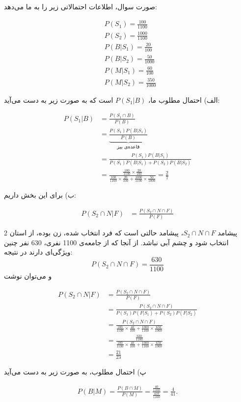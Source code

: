 \documentclass[10pt,letterpaper]{report}
\newcounter{questionanswernumber}
\newcommand{\QA}{
\textbf{پاسخ سوال \thequestionanswernumber)}
\stepcounter{questionanswernumber}
}
\newcommand{\eqn}[1]{
\[\begin{split}
#1
\end{split}\]
}
\begin{document}
صورت سوال، اطلاعات احتمالاتی زیر را به ما می‌دهد:
\eqn{
&
P(S_1)=\frac{100}{1100}
\\&
P(S_2)=\frac{1000}{1100}
\\&
P(B|S_1)=\frac{20}{100}
\\&
P(B|S_2)=\frac{50}{1000}
\\&
P(M|S_1)=\frac{60}{100}
\\&
P(M|S_2)=\frac{350}{1000}
}

الف) احتمال مطلوب ما،
$P(S_1|B)$
است که به صورت زیر به دست می‌آید:
\eqn{
P(S_1|B)&=
\frac{P(S_1\cap B)}{P(B)}
\\&=
\underbrace{\frac{P(S_1)P(B|S_1)}{P(B)}}_{\text{قاعده‌ی بیز}}
\\&=
\frac{P(S_1)P(B|S_1)}{P(S_1)P(B|S_1)+P(S_2)P(B|S_2)}
\\&=
\frac{
\frac{100}{1100}\times \frac{20}{100}
}{
\frac{100}{1100}\times \frac{20}{100}+\frac{1000}{1100}\times \frac{50}{1000}
}
=\frac{2}{7}
}

ب) برای این بخش داریم:
\eqn{
P(S_2\cap N|F)&=
\frac{P(S_2\cap N\cap F)}{P(F)}
}
پیشامد $S_2\cap N\cap F$، پیشامد حالتی است که فرد انتخاب شده، زن بوده، از استان 2 انتخاب شود و چشم آبی نباشد. از آنجا که از جامعه‌ی 1100 نفری، 630 نفر چنین ویژگی‌ای دارند در نتیجه:
$$P(S_2\cap N\cap F)=\frac{630}{1100}$$
و می‌توان نوشت
\eqn{
P(S_2\cap N|F)&=
\frac{P(S_2\cap N\cap F)}{P(F)}
\\&=
\frac{P(S_2\cap N\cap F)}{P(S_1)P(F|S_1)+P(S_2)P(F|S_2)}
\\&=
\frac{P(S_2\cap N\cap F)}{
\frac{100}{1100}\times \frac{40}{100}+\frac{1000}{1100}\times \frac{650}{1000}
}
\\&=
\frac{\frac{630}{1100}}{
\frac{100}{1100}\times \frac{40}{100}+\frac{1000}{1100}\times \frac{650}{1000}
}
\\&=
\frac{21}{23}
}

پ) احتمال مطلوب، به صورت زیر به دست می‌آید
\eqn{
P(B|M)=\frac{P(B\cap M)}{P(M)}=\frac{\frac{40}{1100}}{\frac{410}{1100}}=\frac{4}{41}.
}{}

%
%
\end{document}
